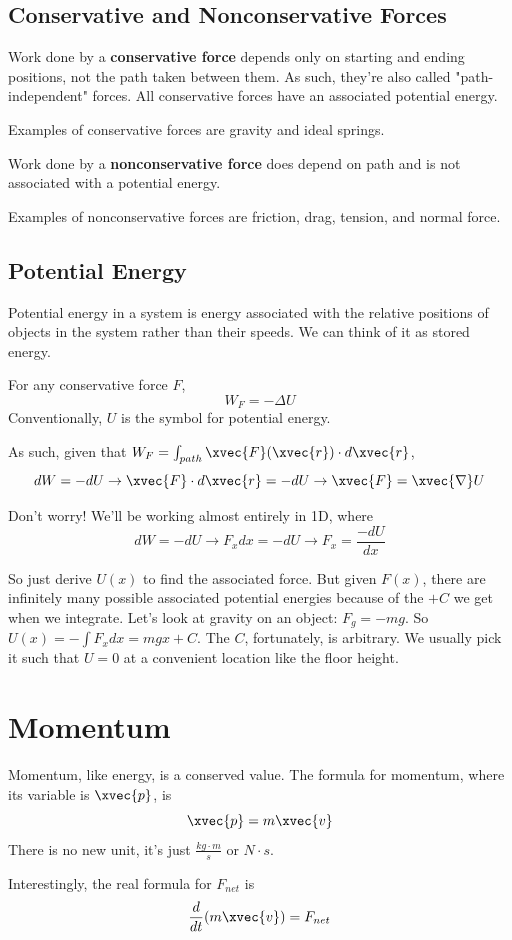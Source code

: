 \documentclass{article}
\begin{document}
\subsection{Conservative and Nonconservative Forces}
Work done by a \textbf{conservative force} depends only on starting and ending positions, not the path taken between them. As such, they're also called "path-independent" forces.
All conservative forces have an associated potential energy.

Examples of conservative forces are gravity and ideal springs.

Work done by a \textbf{nonconservative force} does depend on path and is not associated with a potential energy.

Examples of nonconservative forces are friction, drag, tension, and normal force.

\subsection{Potential Energy}
Potential energy in a system is energy associated with the relative positions of objects in the system rather than their speeds. We can think of it as stored energy.

For any conservative force $F$,
$$W_F = -\Delta U$$
Conventionally, $U$ is the symbol for potential energy.

As such, given that $W_F = \int_{path}^{}{\xvec{F}(\xvec{r}) \cdot d\xvec{r}}$,
$$ dW = -dU \to \xvec{F} \cdot d\xvec{r} = -dU \to \xvec{F} = \xvec{\nabla}U $$

Don't worry! We'll be working almost entirely in 1D, where
$$ dW = -dU \to F_xdx = -dU \to F_x = \frac{-dU}{dx}$$

So just derive $U(x)$ to find the associated force. But given $F(x)$, there are infinitely many possible associated potential energies because of the $+C$ we get when we integrate. Let's look at gravity on an object: $F_g = -mg$.
So $U(x) = -\int{F_xdx} = mgx+C$. The $C$, fortunately, is arbitrary. We usually pick it such that $U=0$ at a convenient location like the floor height.

\section{Momentum}
Momentum, like energy, is a conserved value. The formula for momentum, where its variable is $\xvec{p}$, is
$$ \xvec{p} = m\xvec{v} $$
There is no new unit, it's just $\frac{kg \cdot m}{s}$ or $N \cdot s$.

Interestingly, the real formula for $F_{net}$ is
$$ \frac{d}{dt}(m\xvec{v}) = F_{net} $$
\end{document}
